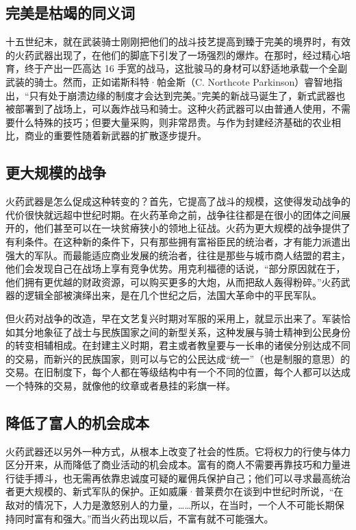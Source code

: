 \subsection{完美是枯竭的同义词}
十五世纪末，就在武装骑士刚刚把他们的战斗技艺提高到臻于完美的境界时，有效的火药武器出现了，在他们的脚底下引发了一场强烈的爆炸。在那时，经过精心培育，终于产出一匹高达 16 手宽的战马，这批骏马的身材可以舒适地承载一个全副武装的骑士。然而，正如诺斯科特·帕金斯（C. Northcote Parkinson）睿智地指出，“只有处于崩溃边缘的制度才会达到完美。”完美的新战马诞生了，新式武器也被部署到了战场上，可以轰炸战马和骑士。这种火药武器可以由普通人使用，不需要什么特殊的技巧；但要大量采购，则非常昂贵。与作为封建经济基础的农业相比，商业的重要性随着新武器的扩散逐步提升。

\subsection{更大规模的战争}
火药武器是怎么促成这种转变的？首先，它提高了战斗的规模，这使得发动战争的代价很快就远超中世纪时期。在火药革命之前，战争往往都是在很小的团体之间展开的，他们甚至可以在一块贫瘠狭小的领地上征战。火药为更大规模的战争提供了有利条件。在这种新的条件下，只有那些拥有富裕臣民的统治者，才有能力派遣出强大的军队。而最能适应商业发展的统治者，往往是那些与城市商人结盟的君主，他们会发现自己在战场上享有竞争优势。用克利福德的话说，“部分原因就在于，他们拥有更优越的财政资源，可以购买更多的大炮，从而把敌人轰得粉碎。”火药武器的逻辑全部被演绎出来，是在几个世纪之后，法国大革命中的平民军队。

但火药对战争的改造，早在文艺复兴时期对军服的采用上，就显示出来了。军装恰如其分地象征了战士与民族国家之间的新型关系，这种发展与骑士精神到公民身份的转变相辅相成。在封建主义时期，君主或者教皇要与一长串的诸侯分别达成不同的交易，而新兴的民族国家，则可以与它的公民达成“统一”（也是制服的意思）的交易。在旧制度下，每个人都在等级结构中有一个不同的位置，每个人都可以达成一个特殊的交易，就像他的纹章或者悬挂的彩旗一样。

\subsection{降低了富人的机会成本}
火药武器还以另外一种方式，从根本上改变了社会的性质。它将权力的行使与体力区分开来，从而降低了商业活动的机会成本。富有的商人不需要再靠技巧和力量进行徒手搏斗，也无需再依靠忠诚度可疑的雇佣兵保护自己；他们可以寻求最高统治者更大规模的、新式军队的保护。正如威廉·普莱费尔在谈到中世纪时所说，“在敌对的情况下，人力是激怒别人的力量，……所以，在当时，一个人不可能长期保持同时富有和强大。”而当火药出现以后，不富有就不可能强大。

